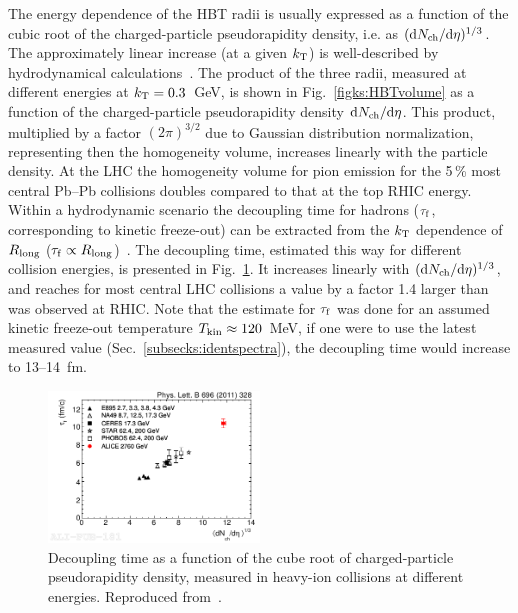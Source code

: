 The energy dependence of the HBT radii is usually expressed as a function of the cubic root of the charged-particle pseudorapidity density, i.e. as $({\rm d}N_{\rm ch}/{\rm d}\eta)^{1/3}$. The approximately linear increase (at a given $k_{\rm T}$) is well-described by hydrodynamical calculations~\cite{Chojnacki:2007rq,Karpenko:2009wf}. The product of the three radii, measured at different energies at $k_{\rm T} = 0.3$~GeV, is shown in Fig.~\ref{figks:HBTvolume} as a function of the charged-particle pseudorapidity density ${\rm d}N_{\rm ch}/{\rm d}\eta$. This product, multiplied by a factor $(2\pi)^{3/2}$ due to Gaussian distribution normalization, representing then the homogeneity volume, increases linearly with the particle density. At the LHC the homogeneity volume for pion emission for the 5\,\% most central Pb--Pb collisions doubles compared to that at the top RHIC energy. Within a hydrodynamic scenario the decoupling time for hadrons ($\tau_{\rm f}$, corresponding to kinetic freeze-out) can be extracted from the $k_{\rm T}$ dependence of $R_{\rm long}$ ($\tau_{\rm f} \propto R_{\rm long}$)~\cite{Herrmann:1994rr}. The decoupling time, estimated this way for different collision energies, is presented in Fig.~\ref{figks:HBTtime}. It increases linearly with $({\rm d}N_{\rm ch}/{\rm d}\eta)^{1/3}$, and reaches for most central LHC collisions a value by a factor 1.4 larger than was observed at RHIC. Note that the estimate for $\tau_{\rm f}$ was done for an assumed kinetic freeze-out temperature $T_{\rm kin} \approx 120$~MeV, if one were to use the latest measured value (Sec.~\ref{subsecks:identspectra}), the decoupling time would increase to 13--14~fm.

\begin{figure}
\centering
\includegraphics[width=0.5\textwidth]{ksfigures/HBTDecouplTime.pdf}
\caption{Decoupling time as a function of the cube root of charged-particle pseudorapidity density, measured in heavy-ion collisions at different energies. Reproduced from~\cite{Aamodt:2011mr}.}
\label{figks:HBTtime}
\end{figure}

